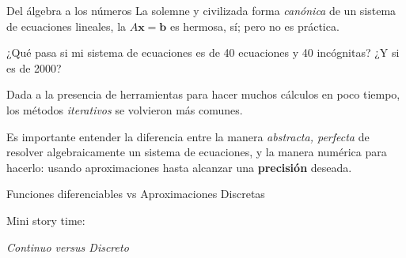 \documentclass[spanish, c]{beamer}
\begin{document}
\begin{frame}{Del álgebra a los números}
    La solemne y civilizada forma \textit{canónica} de un sistema de ecuaciones lineales, la $A\mathbf{x} = \mathbf{b}$ es hermosa, sí; pero no es práctica. \pause
    
    ¿Qué pasa si mi sistema de ecuaciones es de 40 ecuaciones y 40 incógnitas? \pause ¿Y si es de 2000? \pause

    \bigskip

    Dada a la presencia de herramientas para hacer muchos cálculos en poco tiempo, los métodos \textit{iterativos} se volvieron más comunes. \pause
    
    \bigskip

    Es importante entender la diferencia entre la manera \textit{abstracta, perfecta} de resolver \alert{algebraicamente} un sistema de ecuaciones, y la manera \alert{numérica} para hacerlo: usando aproximaciones hasta alcanzar una \textbf{precisión} deseada.
\end{frame}

\begin{frame}{Funciones diferenciables vs Aproximaciones Discretas}
    \begin{center}
        \Huge Mini story time:
        
        \textit{Continuo versus Discreto}
    \end{center}
\end{frame}



\end{document}
